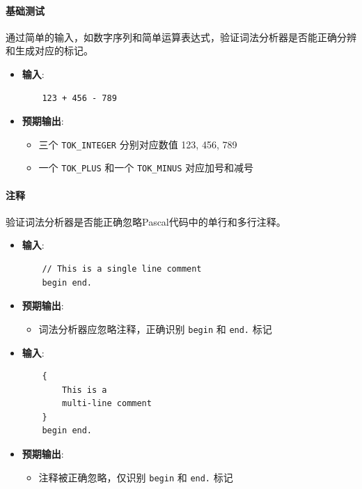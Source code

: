 \documentclass[../main.tex]{subfiles}
\begin{document}
\paragraph{基础测试}
通过简单的输入，如数字序列和简单运算表达式，验证词法分析器是否能正确分辨和生成对应的标记。

\begin{itemize}
    \item \textbf{输入}:
    \begin{verbatim}
    123 + 456 - 789
    \end{verbatim}
    \item \textbf{预期输出}:
    \begin{itemize}
        \item 三个 \texttt{TOK\_INTEGER} 分别对应数值 123, 456, 789
        \item 一个 \texttt{TOK\_PLUS} 和一个 \texttt{TOK\_MINUS} 对应加号和减号
    \end{itemize}
\end{itemize}

\paragraph{注释} 
验证词法分析器是否能正确忽略Pascal代码中的单行和多行注释。

\begin{itemize}
    \item \textbf{输入}:
    \begin{verbatim}
    // This is a single line comment
    begin end.
    \end{verbatim}
    \item \textbf{预期输出}:
    \begin{itemize}
        \item 词法分析器应忽略注释，正确识别 \texttt{begin} 和 \texttt{end.} 标记
    \end{itemize}
\end{itemize}

\begin{itemize}
    \item \textbf{输入}:
    \begin{verbatim}
    {
        This is a
        multi-line comment
    }
    begin end.
    \end{verbatim}
    \item \textbf{预期输出}:
    \begin{itemize}
        \item 注释被正确忽略，仅识别 \texttt{begin} 和 \texttt{end.} 标记
    \end{itemize}
\end{itemize}
\end{document}
